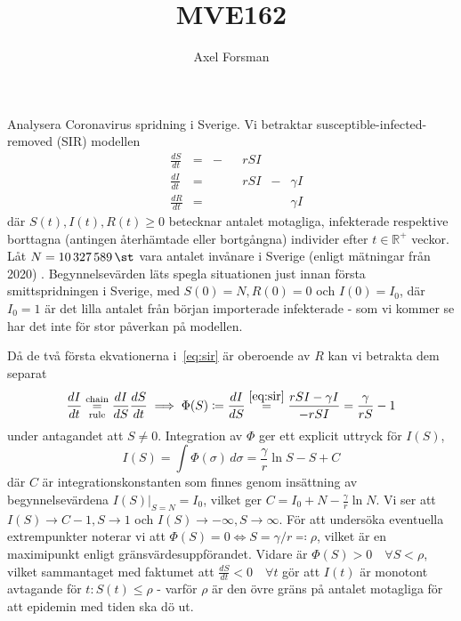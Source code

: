 \documentclass{article}
\title{MVE162}
\author{Axel Forsman}
\begin{document}

Analysera Coronavirus spridning i Sverige.
Vi betraktar susceptible-infected-removed (SIR) modellen
\begin{equation}\label{eq:sir}
	\begin{alignedat}{4}
		& \frac{dS}{dt} &=& -&&rSI && \\
		& \frac{dI}{dt} &=& &&rSI &-& \gamma I \\
		& \frac{dR}{dt} &=& && &&\gamma I
	\end{alignedat}
\end{equation}
där $S(t), I(t), R(t) \ge 0$ betecknar antalet motagliga, infekterade
respektive borttagna (antingen återhämtade eller bortgångna)
individer efter $t \in \mathbb R^+$ veckor.
\def\N{10327589}
Låt $N = \SI{10327589}\st$ vara antalet invånare i Sverige
(enligt mätningar från 2020) \autocite{population}.
Begynnelsevärden läts spegla situationen just innan
första smittspridningen i Sverige,
med $S(0) = N, R(0) = 0$ och $I(0) = I_0$,
där $I_0 = 1$ är det lilla antalet från början importerade infekterade -
som vi kommer se har det inte för stor påverkan på modellen. %


Då de två första ekvationerna i~\eqref{eq:sir}
är oberoende av $R$
kan vi betrakta dem separat
$$ \frac{dI}{dt} \overset{\text{chain}}{\underset{\text{rule}}=} \frac{dI}{dS} \frac{dS}{dt}
\implies \Phi(S) \coloneqq \frac{dI}{dS} \overset{\eqref{eq:sir}}= \frac{rSI - \gamma I}{-rSI} = \frac\gamma{rS} - 1 $$
under antagandet att $S \ne 0$.
Integration av $\Phi$ ger ett explicit uttryck för $I(S)$,
$$ I(S) = \int \Phi(\sigma) \, d\sigma = \frac\gamma r \ln S - S + C $$
där $C$ är integrationskonstanten som finnes genom
insättning av begynnelsevärdena $I(S) \vert_{S=N} = I_0$,
vilket ger $C = I_0 + N - \frac\gamma r \ln N$.
Vi ser att $I(S) \to C - 1, S \to 1$ och $I(S) \to -\infty, S \to \infty$.
För att undersöka eventuella extrempunkter
noterar vi att $\Phi(S) = 0 \Leftrightarrow S = \gamma / r \eqqcolon \rho$,
vilket är en maximipunkt enligt gränsvärdesuppförandet.
Vidare är $\Phi(S) > 0 \quad \forall S < \rho$,
vilket sammantaget med faktumet att
$\frac{dS}{dt} < 0 \quad \forall t$
gör att $I(t)$ är monotont avtagande för $t : S(t) \le \rho$ -
varför $\rho$ är den övre gräns på antalet motagliga
för att epidemin med tiden ska dö ut.
\end{document}
